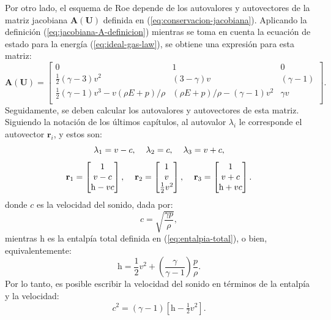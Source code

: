 Por otro lado, el esquema de Roe depende de los autovalores y autovectores de la matriz jacobiana $\mathbf{A(\mathbf{U})}$ definida en (\ref{eq:conservacion-jacobiana}). Aplicando la definición (\ref{eq:jacobiana-A-definicion}) mientras se toma en cuenta la ecuación de estado para la energía (\ref{eq:ideal-gas-law}), se obtiene una expresión para esta matriz:
\begin{equation}
	\mathbf{A(\mathbf{U})} =
	\begin{bmatrix}
		0 & 1 & 0 \\
		\frac{1}{2}(\gamma - 3)v^2 & (3  - \gamma) v & (\gamma - 1) \\
		\frac{1}{2}(\gamma - 1)v^3 - v(\rho E+p)/\rho & (\rho E+p)/\rho-(\gamma - 1)v^2 & \gamma v \\
	\end{bmatrix}.
\end{equation}
Seguidamente, se deben calcular los autovalores y autovectores de esta matriz. Siguiendo la notación de los últimos capítulos, al autovalor $\lambda_i$ le corresponde el autovector $\mathbf{r}_i$, y estos son:
\begin{equation}
	\lambda_1 = v-c, \hspace{4mm}
	\lambda_2 = c, \hspace{4mm}
	\lambda_3 = v+c,
\end{equation}
\begin{equation}
	\mathbf{r}_1 = 
	\begin{bmatrix}
		1 \\
		v-c \\
		\mathrm{h}-vc
	\end{bmatrix},\hspace{4mm}
	\mathbf{r}_2 = 
	\begin{bmatrix}
		1 \\
		v \\
		\frac{1}{2}v^{2}
	\end{bmatrix},\hspace{4mm}
	\mathbf{r}_3 = 
	\begin{bmatrix}
		1 \\
		v+c \\
		\mathrm{h}+vc
	\end{bmatrix}.
\end{equation}
donde $c$ es la velocidad del sonido, dada por:
\begin{equation}
	c = \sqrt{\frac{\gamma p}{\rho}},
\end{equation}
mientras $\mathrm{h}$ es la entalpía total definida en (\ref{eq:entalpia-total}), o bien, equivalentemente:
\begin{equation}
	\mathrm{h} = \frac{1}{2}v^2 + \left(\frac{\gamma}{\gamma - 1}\right)\frac{p}{\rho}.
\end{equation}
Por lo tanto, es posible escribir la velocidad del sonido en términos de la entalpía y la velocidad:
\begin{equation}
	c^2 = (\gamma - 1)\left[\mathrm{h} - \tfrac{1}{2}v^{2}\right].
\end{equation}

